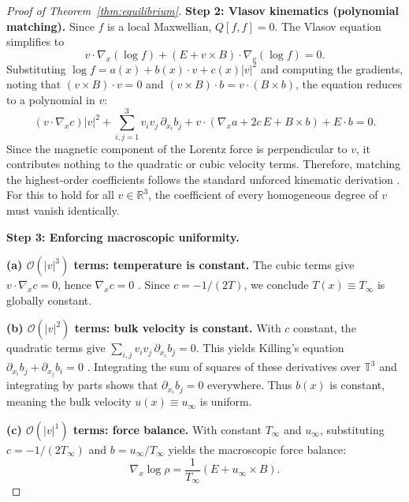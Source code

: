 \documentclass[]{article}
\newcommand{\R}{\mathbb{R}}
\numberwithin{equation}{section}
\begin{document}
\begin{proof}[Proof of Theorem~\ref{thm:equilibrium}]
\textbf{Step 2: Vlasov kinematics (polynomial matching).}
Since $f$ is a local Maxwellian, $Q[f,f] = 0$.  The Vlasov equation simplifies to
\[
v \cdot \nabla_x (\log f) + (E + v \times B) \cdot \nabla_v (\log f) = 0.
\]
Substituting $\log f = a(x) + b(x) \cdot v + c(x)|v|^2$ and computing the gradients, noting that $(v \times B) \cdot v = 0$ and $(v \times B) \cdot b = v \cdot (B \times b)$, the equation reduces to a polynomial in $v$:
\begin{equation}
\label{eq:poly_v}
(v \cdot \nabla_x c)|v|^2 + \sum_{i,j=1}^{3} v_i v_j \, \partial_{x_i} b_j + v \cdot \!\left(\nabla_x a + 2c\, E + B \times b\right) + E \cdot b = 0.
\end{equation}
Since the magnetic component of the Lorentz force is perpendicular to $v$, it contributes nothing to the quadratic or cubic velocity terms.  Therefore, matching the highest-order coefficients follows the standard unforced kinematic derivation \citep[Ch.~III.10, Eqs.~10.6--10.7]{cercignani1988boltzmann}.
For this to hold for all $v \in \R^3$, the coefficient of every homogeneous degree of $v$ must vanish identically.

\textbf{Step 3: Enforcing macroscopic uniformity.}

\textbf{(a) $\mathcal{O}(|v|^3)$ terms: temperature is constant.}  The cubic terms give $v \cdot \nabla_x c = 0$, hence $\nabla_x c = 0$ \citep[Eq.~10.7]{cercignani1988boltzmann}.  Since $c = -1/(2T)$, we conclude $T(x) \equiv T_\infty$ is globally constant.

\textbf{(b) $\mathcal{O}(|v|^2)$ terms: bulk velocity is constant.}  With $c$ constant, the quadratic terms give $\sum_{i,j} v_i v_j \, \partial_{x_i} b_j = 0$.  This yields Killing's equation $\partial_{x_i} b_j + \partial_{x_j} b_i = 0$ \citep[Eq.~10.6]{cercignani1988boltzmann}.  Integrating the sum of squares of these derivatives over $\mathbb{T}^3$ and integrating by parts shows that $\partial_{x_i} b_j = 0$ everywhere.  Thus $b(x)$ is constant, meaning the bulk velocity $u(x) \equiv u_\infty$ is uniform.

\textbf{(c) $\mathcal{O}(|v|^1)$ terms: force balance.}  With constant $T_\infty$ and $u_\infty$, substituting $c = -1/(2T_\infty)$ and $b = u_\infty / T_\infty$ yields the macroscopic force balance:
\begin{equation}
\label{eq:force_balance}
\nabla_x \log \rho = \frac{1}{T_\infty}(E + u_\infty \times B).
\end{equation}


\end{proof}
\end{document}
